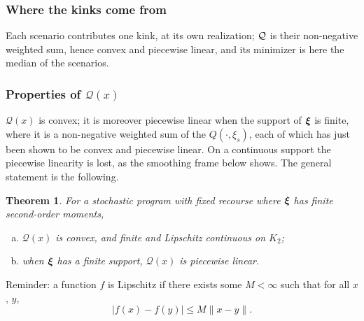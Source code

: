\documentclass[aspectratio=169]{beamer}
\newtheorem{theo}{Theorem}
\begin{document}
\begin{frame}
\frametitle{Where the kinks come from}

\begin{center}
\end{center}

Each scenario contributes one kink, at its own realization; ${\mathcal{Q}}$ is their non-negative weighted sum, hence convex and piecewise linear, and its minimizer is here the median of the scenarios.

\end{frame}


\begin{frame}
\frametitle{Properties of $\mathcal{Q}(x)$}

$\mathcal{Q}(x)$ is convex; it is moreover piecewise linear {\red when the support of ${\boldsymbol{\xi}}$ is finite}, where it is a non-negative weighted sum of the $Q(\cdot,\xi_s)$, each of which has just been shown to be convex and piecewise linear.
On a continuous support the piecewise linearity is lost, as the smoothing frame below shows.
The general statement is the following.

\begin{theo}
For a stochastic program with fixed recourse where ${\boldsymbol{\xi}}$ has finite second-order moments,
\begin{enumerate}[(a)]
\item
$\mathcal{Q}(x)$ is convex, and finite and Lipschitz continuous on $K_2$;
\item
when ${\boldsymbol{\xi}}$ has a finite support, $\mathcal{Q}(x)$ is piecewise linear.
\end{enumerate}
\end{theo}

Reminder: a function $f$ is Lipschitz if there exists some $M < \infty$ such that for all $x$, $y$,
\[
|f(x)-f(y)| \leq M \| x-y \|.
\]

\end{frame}
\end{document}
